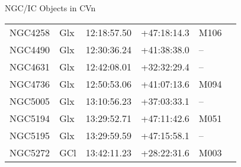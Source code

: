 \begin{block}{NGC/IC Objects in CVn}
  \centering
  \begin{tabularx}{\textwidth}{llrrll} \toprule 
    NGC4258 & Glx & 12:18:57.50 & +47:18:14.3  & M106 \\ 
    NGC4490 & Glx & 12:30:36.24 & +41:38:38.0  & -- \\ 
    NGC4631 & Glx & 12:42:08.01 & +32:32:29.4  & -- \\ 
    NGC4736 & Glx & 12:50:53.06 & +41:07:13.6  & M094 \\ 
    NGC5005 & Glx & 13:10:56.23 & +37:03:33.1  & -- \\ 
    NGC5194 & Glx & 13:29:52.71 & +47:11:42.6  & M051 \\ 
    NGC5195 & Glx & 13:29:59.59 & +47:15:58.1  & -- \\ 
    NGC5272 & GCl & 13:42:11.23 & +28:22:31.6  & M003 \\ 
  \end{tabularx}
\end{block}